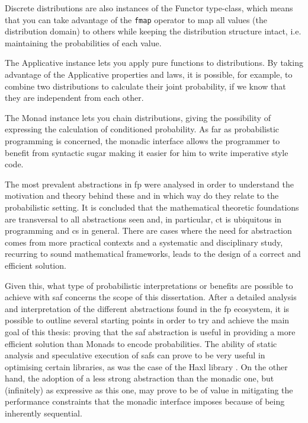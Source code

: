 \documentclass[
  oneside,
  11pt, a4paper,
  footinclude=true,
  headinclude=true,
  cleardoublepage=empty
]{scrbook}
\theoremstyle{definition}
\theoremstyle{definition}
\begin{document}
    Discrete distributions are also instances of the Functor type-class, which means that you can take advantage of the \texttt{fmap} operator to map all values (the distribution domain) to others while keeping the distribution structure intact, i.e. maintaining the probabilities of each value.
        
    The Applicative instance lets you apply pure functions to distributions. By taking advantage of the Applicative properties and laws, it is possible, for example, to combine two distributions to calculate their joint probability, if we know that they are independent from each other.
        
    The Monad instance lets you chain distributions, giving the possibility of expressing the calculation of conditioned probability. As far as probabilistic programming is concerned, the monadic interface allows the programmer to benefit from syntactic sugar making it easier for him to write imperative style code.
    
    The most prevalent abstractions in \gls{fp} were analysed in order to understand the motivation and theory behind these and in which way do they relate to the probabilistic setting. It is concluded that the mathematical theoretic foundations are transversal to all abstractions seen and, in particular, \gls{ct} is ubiquitous in programming and \gls{cs} in general. There are cases where the need for abstraction comes from more practical contexts and a systematic and disciplinary study, recurring to sound mathematical frameworks, leads to the design of a correct and efficient solution.
    
    Given this, what type of probabilistic interpretations or benefits are possible to achieve with \gls{saf} concerns the scope of this dissertation. After a detailed analysis and interpretation of the different abstractions found in the \gls{fp} ecosystem, it is possible to outline several starting points in order to try and achieve the main goal of this thesis: proving that the \gls{saf} abstraction is useful in providing a more efficient solution than Monads to encode probabilities. The ability of static analysis and speculative execution of \glspl{saf} can prove to be very useful in optimising certain libraries, as was the case of the Haxl library \citep{Marlow:2014:NFA:2692915.2628144, andrey2019selective}. On the other hand, the adoption of a less strong abstraction than the monadic one, but (infinitely) as expressive as this one, may prove to be of value in mitigating the performance constraints that the monadic interface imposes because of being inherently sequential.
    
\end{document}
